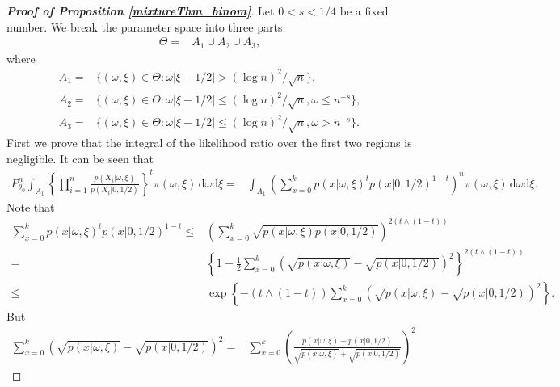 \documentclass[11pt]{article}
\theoremstyle{plain}
\theoremstyle{definition}
\theoremstyle{remark}
\begin{document}
\begin{appendices}
\begin{proof}[\textbf{Proof of Proposition \ref{mixtureThm_binom}}]

    Let $0< s < 1/4$ be a fixed number.
    We break the parameter space into three parts:
    \begin{align*}
        \Theta
        =
        &
        A_1 
        \cup
        A_2
        \cup
        A_3
    ,
    \end{align*}
    where
    \begin{align*}
         A_1 =& 
        \{(\omega, \xi) \in \Theta:
            \omega | \xi - 1/2 | > {(\log n)^2}/{ \sqrt n}
        \} ,
    \\
    A_2 = &
        \{(\omega, \xi) \in \Theta:
            \omega | \xi - 1/2 | \leq {(\log n)^2}/{ \sqrt n}, 
            \omega \leq n^{-s}
        \},
    \\
    A_3 = &
        \{(\omega, \xi) \in \Theta:
            \omega | \xi - 1/2 | \leq {(\log n)^2}/{ \sqrt n}, 
            \omega > n^{-s}
        \}.
    \end{align*}
    First we prove that the integral of the likelihood ratio over the first two regions is negligible.
    It can be seen that 
\begin{equation*}
    \begin{split}
        P^n_{\theta_0} \int_{A_1} \left\{\prod_{i=1}^n \frac{p(X_i|\omega, \xi)}{p(X_i|0, 1/2 )}\right\}^t \pi(\omega, \xi)\, \mathrm d\omega \mathrm d \xi
    =&
    \int_{A_1} \left( \sum_{x=0}^k p( x |\omega, \xi)^t p( x |0, 1/2 )^{1-t} \right)^n \pi(\omega, \xi)\, \mathrm d\omega \mathrm d \xi.
    \end{split}
\end{equation*}
Note that
\begin{align*}
    \sum_{x=0}^k p( x |\omega, \xi)^t p( x |0, 1/2  )^{1-t}
    \leq&  \left( \sum_{x=0}^k \sqrt{p( x |\omega, \xi) p( x |0, 1/2 )} \right)^{2(t\wedge (1-t))}
    \\
    = & \left\{1-\frac{1}{2} \sum_{x=0}^k \left(\sqrt{p( x |\omega, \xi) }-\sqrt{p( x |0, 1/2  )}\right)^2 \right\}^{2(t\wedge (1-t))}
\\
\leq & \exp \left\{ -(t\wedge (1-t)) \sum_{x=0}^k \left(\sqrt{p( x |\omega,\xi) }-\sqrt{p( x |0, 1/2  )}\right)^2 \right\}
.
\end{align*}
But
\begin{align*}
    \sum_{x=0}^k \left(\sqrt{p( x |\omega, \xi) }-\sqrt{p( x |0, 1/2  )}\right)^2 
=&
\sum_{x=0}^k \left(\frac{{p( x |\omega,\xi) }-{p( x |0, 1/2  )}}{\sqrt{p( x |\omega, \xi) }+\sqrt{p( x |0, 1/2  )}}\right)^2 

\end{align*}
\end{proof}
\end{appendices}
\end{document}
